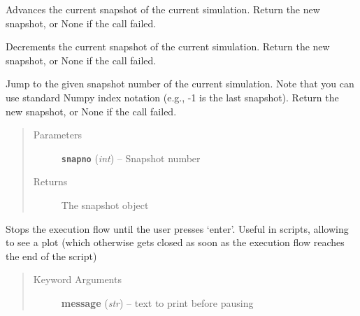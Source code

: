 \documentclass[letterpaper,10pt,english]{sphinxmanual}
\begin{document}

\begin{fulllineitems}
\label{index:facade.next}
Advances the current snapshot of the current simulation.
Return the new snapshot, or None if the call failed.

\end{fulllineitems}


\begin{fulllineitems}
\label{index:facade.previous}
Decrements the current snapshot of the current simulation.
Return the new snapshot, or None if the call failed.

\end{fulllineitems}


\begin{fulllineitems}
\label{index:facade.snap}
Jump to the given snapshot number of the current simulation.  Note that
you can use standard Numpy index notation (e.g., -1 is the last snapshot).
Return the new snapshot, or None if the call failed.
\begin{quote}\begin{description}
\item[{Parameters}] \leavevmode
\textbf{\texttt{snapno}} (\emph{int}) -- Snapshot number

\item[{Returns}] \leavevmode
The snapshot object

\end{description}\end{quote}

\end{fulllineitems}


\begin{fulllineitems}
\label{index:facade.block}
Stops the execution flow until the user presses `enter'.
Useful in scripts, allowing to see a plot (which otherwise gets closed
as soon as the execution flow reaches the end of the script)
\begin{quote}\begin{description}
\item[{Keyword Arguments}] \leavevmode
\textbf{message} (\emph{str}) --
text to print before pausing

\end{description}\end{quote}

\end{fulllineitems}
\end{document}
